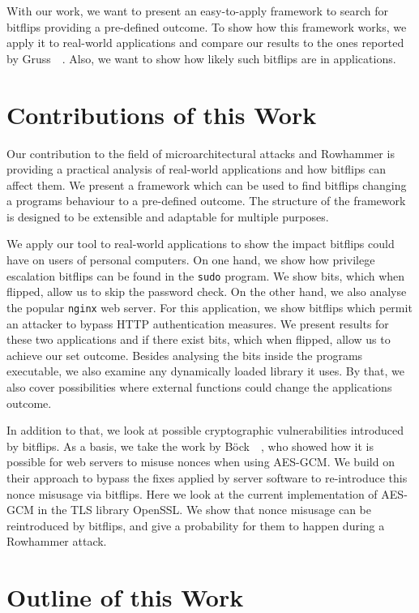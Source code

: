 With our work, we want to present an easy-to-apply framework to search for
bitflips providing a pre-defined outcome. To show how this framework works, we
apply it to real-world applications and compare our results to the ones reported
by Gruss~\etal~\cite{flipinthewall}. Also, we want to show how likely such
bitflips are in applications.

\section{Contributions of this Work}

Our contribution to the field of microarchitectural attacks and Rowhammer is
providing a practical analysis of real-world applications and how bitflips can
affect them. We present a framework which can be used to find bitflips changing
a program\textquotesingle s behaviour to a pre-defined outcome. The structure of
the framework is designed to be extensible and adaptable for multiple purposes.

We apply our tool to real-world applications to show the impact bitflips could
have on users of personal computers. On one hand, we show how privilege
escalation bitflips can be found in the \texttt{sudo} program. We show bits,
which when flipped, allow us to skip the password check. On the other hand, we
also analyse the popular \texttt{nginx} web server. For this application, we
show bitflips which permit an attacker to bypass HTTP authentication measures.
We present results for these two applications and if there exist bits, which
when flipped, allow us to achieve our set outcome. Besides analysing the bits
inside the program\textquotesingle s executable, we also examine any dynamically
loaded library it uses. By that, we also cover possibilities where external
functions could change the application\textquotesingle s outcome.

In addition to that, we look at possible cryptographic vulnerabilities
introduced by bitflips. As a basis, we take the work by
Böck~\etal~\cite{gcmnonceattack}, who showed how it is possible for web servers
to misuse nonces when using AES-GCM. We build on their approach to bypass the
fixes applied by server software to re-introduce this nonce misusage via
bitflips. Here we look at the current implementation of AES-GCM in the TLS
library OpenSSL. We show that nonce misusage can be reintroduced by bitflips,
and give a probability for them to happen during a Rowhammer attack.

\section{Outline of this Work}


